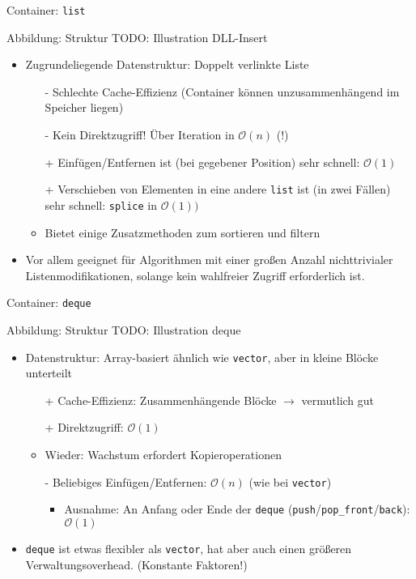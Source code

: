 \begin{frame}[fragile]{Container: \texttt{list}}
	\begin{block}{Abbildung: Struktur}
		TODO: Illustration DLL-Insert
	\end{block}

	\begin{itemize}
		\item Zugrundeliegende Datenstruktur: Doppelt verlinkte Liste
		\pause
		\begin{itemize}
			\item[-] Schlechte Cache-Effizienz (Container können unzusammenhängend im Speicher liegen)
			\item[-] Kein Direktzugriff! Über Iteration in $\mathcal{O}(n)$ (!)
			\pause
			\item[+] Einfügen/Entfernen ist (bei gegebener Position) sehr schnell: $\mathcal{O}(1)$
			\item[+] Verschieben von Elementen in eine andere \verb|list| ist (in zwei Fällen) sehr schnell: \verb|splice| in $\mathcal{O}(1))$
			\item Bietet einige Zusatzmethoden zum sortieren und filtern
		\end{itemize}
		\pause
		\item Vor allem geeignet für Algorithmen mit einer großen Anzahl nichttrivialer Listenmodifikationen, solange kein wahlfreier Zugriff erforderlich ist.
	\end{itemize}
\end{frame}

\begin{frame}[fragile]{Container: \texttt{deque}}
	\begin{block}{Abbildung: Struktur}
		TODO: Illustration deque
	\end{block}
	
	\begin{itemize}
		\item Datenstruktur: Array-basiert ähnlich wie \verb|vector|, aber in kleine Blöcke unterteilt
		\pause
		\begin{itemize}
			\item[+] Cache-Effizienz: Zusammenhängende Blöcke $\rightarrow$ vermutlich gut
			\item[+] Direktzugriff: $\mathcal{O}(1)$
			\pause
			\item Wieder: Wachstum erfordert Kopieroperationen
			\item[-] Beliebiges Einfügen/Entfernen: $\mathcal{O}(n)$ (wie bei \verb|vector|)
			\begin{itemize}
				\item Ausnahme: An Anfang oder Ende der \verb|deque| (\verb|push|/\verb|pop_front|/\verb|back|): $\mathcal{O}(1)$
			\end{itemize}
		\end{itemize}
		\pause
		\item \verb|deque| ist etwas flexibler als \verb|vector|, hat aber auch einen größeren Verwaltungsoverhead. (Konstante Faktoren!)
	\end{itemize}
\end{frame}

